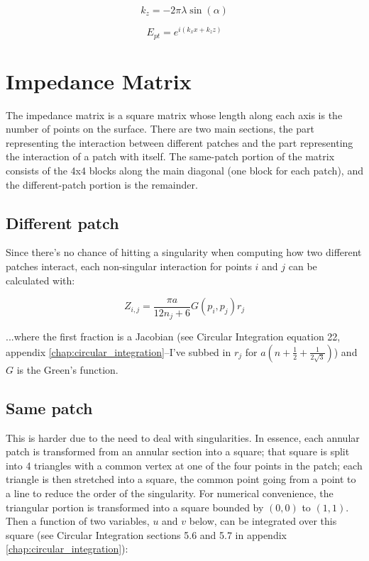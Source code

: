 \documentclass[etd,twoside,senior,noacknowledgments]{BYUPhys}
\begin{document}
\begin{equation}
  k_{z}=-2\pi\lambda\sin\left(\alpha\right)
\end{equation}

\begin{equation}
  E_{pt}=e^{i\left(k_{x}x+k_{z}z\right)}
\end{equation}



\section{Impedance Matrix} \label{sec:impedance}

The impedance matrix is a square matrix whose length along each axis is the number of points on the surface. There are two main sections, the part representing the interaction between different patches and the part representing the interaction of a patch with itself. The same-patch portion of the matrix consists of the 4x4 blocks along the main diagonal (one block for each patch), and the different-patch portion is the remainder.

\subsection{Different patch} \label{sec:different_patch}

Since there's no chance of hitting a singularity when computing how two different patches interact, each non-singular interaction for points $i$ and $j$ can be calculated with:

\begin{equation}
  Z_{i,j}=\frac{\pi a}{12n_{j}+6}G\left(p_{i},p_{j}\right)r_{j}
\end{equation}

...where the first fraction is a Jacobian (see Circular Integration equation 22, appendix \ref{chap:circular_integration}--I've subbed in $r_{j}$ for $a\left(n+\frac{1}{2}+\frac{1}{2\sqrt{3}}\right)$) and $G$ is the Green's function.

\subsection{Same patch} \label{sec:same_patch}

This is harder due to the need to deal with singularities. In essence, each annular patch is transformed from an annular section into a square; that square is split into 4 triangles with a common vertex at one of the four points in the patch; each triangle is then stretched into a square, the common point going from a point to a line to reduce the order of the singularity. For numerical convenience, the triangular portion is transformed into a square bounded by $(0,0)$ to $(1,1)$. Then a function of two variables, $u$ and $v$ below, can be integrated over this square (see Circular Integration sections 5.6 and 5.7 in appendix \ref{chap:circular_integration}):
\end{document}
